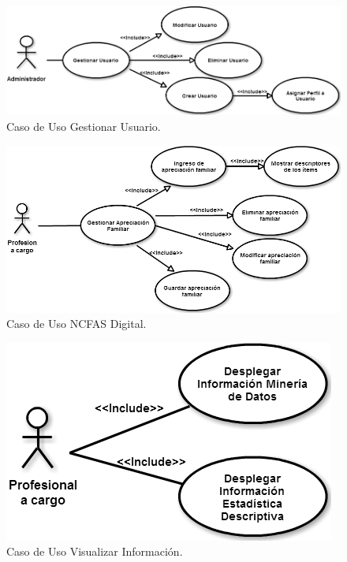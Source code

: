\begin{figure}[htb]
	\label{Figura12}
	\begin{center}
		\includegraphics[scale=0.4]{imagenes/CDU1.png}
	\end{center}
	\caption{Caso de Uso Gestionar Usuario.}
\end{figure}


\begin{figure}[htb]
	\label{Figur7}
	\begin{center}
		\includegraphics[scale=0.4]{imagenes/CDU2.png}
	\end{center}
	\caption{Caso de Uso NCFAS Digital.}
\end{figure}

\newpage
\clearpage

\begin{figure}[htb]
	\label{Figura13}
	\begin{center}
		\includegraphics[scale=0.5]{imagenes/CDU3.png}
	\end{center}
	\caption{Caso de Uso Visualizar Información.}
\end{figure}

